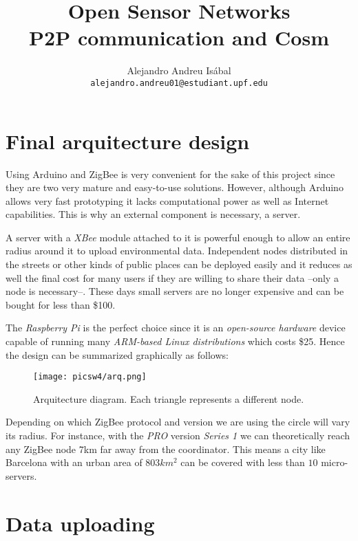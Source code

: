 \documentclass[a4paper,twocolumn]{IEEEtran}
\title{
    Open Sensor Networks\\
    P2P communication and Cosm
}
\author{
    Alejandro Andreu Isábal\\
    \texttt{alejandro.andreu01@estudiant.upf.edu}
}
\begin{document}
    \maketitle


    \section{Final arquitecture design}


        Using Arduino and ZigBee is very convenient for the sake of this project since they are two very mature and easy-to-use solutions. However, although Arduino allows very fast prototyping it lacks computational power as well as Internet capabilities. This is why an external component is necessary, a server.

        A server with a \emph{XBee} module attached to it is powerful enough to allow an entire radius around it to upload environmental data. Independent nodes distributed in the streets or other kinds of public places can be deployed easily and it reduces as well the final cost for many users if they are willing to share their data --only a node is necessary--. These days small servers are no longer expensive and can be bought for less than \$100.

        The \emph{Raspberry Pi} is the perfect choice since it is an \emph{open-source hardware} device capable of running many \emph{ARM-based Linux distributions} which costs \$25. Hence the design can be summarized graphically as follows:

        \begin{figure}[h!]
            \centering
            \texttt{[image: picsw4/arq.png]}
            \caption{Arquitecture diagram. Each triangle represents a different node.}
        \end{figure}

        Depending on which ZigBee protocol and version we are using the circle will vary its radius. For instance, with the \emph{PRO} version \emph{Series 1} we can theoretically reach any ZigBee node 7km far away from the coordinator. This means a city like Barcelona with an urban area of $803km^{2}$ can be covered with less than $10$ micro-servers.


    \section{Data uploading}
\end{document}
